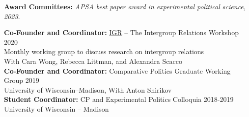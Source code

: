 \documentclass[11pt]{article}
\begin{document}
{\bf Award Committees:} \emph{APSA best paper award in experimental political science, 2023}.\\\vspace*{-2mm}

{\bf Co-Founder and Coordinator:} \href{https://igr.netlify.app/}{IGR} -- The Intergroup Relations Workshop  \hfill  2020\\
Monthly working group to discuss research on intergroup relations\\
With Cara Wong, Rebecca Littman, and Alexandra Scacco\\
{\bf Co-Founder and Coordinator:} Comparative Politics Graduate Working Group \hfill  2019\\
University of Wisconsin--Madison, With Anton Shirikov\\
{\bf Student Coordinator:} CP and Experimental Politics Colloquia \hfill  2018-2019\\
University of Wisconsin -- Madison\\\vspace*{-4mm}

\end{document}

